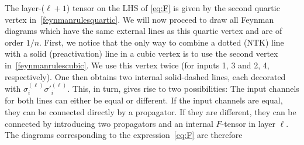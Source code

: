 The layer-($\ell+1$) tensor on the LHS of \eqref{eq:F} is given by the second quartic vertex in~\eqref{feynmanrulesquartic}. We will now proceed to draw all Feynman diagrams which have the same external lines as this quartic vertex and are of order $1/n$. First, we notice that the only way to combine a dotted (NTK) line with a solid (preactivation) line in a cubic vertex is to use the second vertex in~\eqref{feynmanrulescubic}. We use this vertex twice (for inputs 1, 3 and 2, 4, respectively). One then obtains two internal solid-dashed lines, each decorated with ${\sigma}_{i}^{(\ell)}{\sigma'}_{i}^{(\ell)}$. This, in turn, gives rise to two possibilities: The input channels for both lines can either be equal or different. If the input channels are equal, they can be connected directly by a propagator. If they are different, they can be connected by introducing two propagators and an internal $F$-tensor in layer $\ell$. The diagrams corresponding to the expression~\eqref{eq:F} are therefore
%
